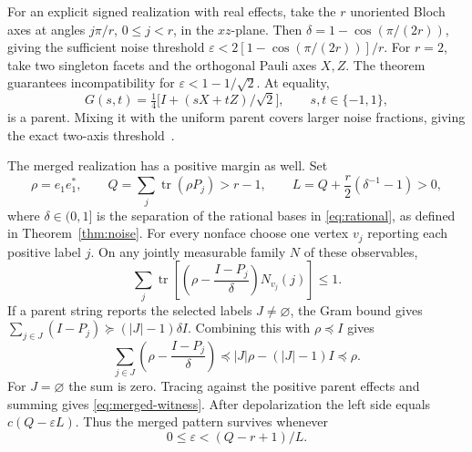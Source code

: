 \documentclass[11pt,a4paper]{article}
\theoremstyle{definition}
\newcommand{\Id}{I}
\newcommand{\tr}{\operatorname{tr}}
\begin{document}
For an explicit signed realization with real effects, take the \(r\)
unoriented Bloch axes at angles \(j\pi/r\), \(0\le j<r\), in the \(xz\)-plane.
Then \(\delta=1-\cos(\pi/(2r))\), giving the sufficient noise threshold
\(\varepsilon<2[1-\cos(\pi/(2r))]/r\).
For \(r=2\), take two singleton facets and the orthogonal Pauli axes
\(X,Z\). The theorem guarantees incompatibility for \(\varepsilon<1-1/\sqrt2\).
At equality,
\[
        G(s,t)=\tfrac14\big[\Id+(sX+tZ)/\sqrt2\big],
        \qquad s,t\in\{-1,1\},
\]
is a parent. Mixing it with the uniform parent covers larger noise
fractions, giving the exact two-axis threshold~\cite{Busch}.

The merged realization has a positive margin as well. Set
\[
 \rho=e_1e_1^*,\qquad Q=\sum_j\tr(\rho P_j)>r-1,\qquad
 L=Q+\frac r2(\delta^{-1}-1)>0,
\]
where \(\delta\in(0,1]\) is the separation of the rational bases in
\eqref{eq:rational}, as defined in Theorem~\ref{thm:noise}.
For every nonface choose one vertex \(v_j\) reporting each positive label
\(j\). On any jointly measurable family \(N\) of these observables,
\begin{equation}\label{eq:merged-witness}
   \sum_j \tr\left[\left(\rho-\frac{\Id-P_j}{\delta}\right)
                         N_{v_j}(j)\right]\le 1 .
\end{equation}
If a parent string reports the selected labels \(J\ne\varnothing\),
the Gram bound gives \(\sum_{j\in J}(\Id-P_j)\succeq (|J|-1)\delta\Id\).
Combining this with \(\rho\preceq\Id\) gives
\[
 \sum_{j\in J}\left(\rho-\frac{\Id-P_j}{\delta}\right)
 \preceq |J|\rho-(|J|-1)\Id\preceq\rho .
\]
For \(J=\varnothing\) the sum is zero. Tracing against the positive
parent effects and summing gives \eqref{eq:merged-witness}.
After depolarization the left side equals \(c(Q-\varepsilon L)\).
Thus the merged pattern survives whenever
\begin{equation}\label{eq:mergedthreshold}
              0\le\varepsilon<(Q-r+1)/L .
\end{equation}
\end{document}
